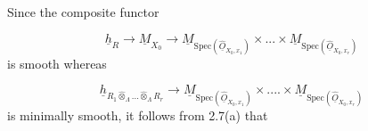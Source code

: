 \begin{center}
\end{center}
Since the composite functor

\begin{equation*}
\underline{h}_R \to \underline{M}_{X_0} \to \underline{M}_{\mathrm{Spec}(\widehat{\underline{O}}_{X_0,x_1})} \times ... \times \underline{M}_{\mathrm{Spec}(\widehat{\underline{O}}_{X_0,x_r})}
\end{equation*}
is smooth whereas

\begin{equation*}
\underline{h}_{R_1 \widehat{\otimes}_\Lambda ... \widehat{\otimes}_\Lambda R_r} \to \underline{M}_{\mathrm{Spec}(\widehat{\underline{O}}_{X_0,x_1})} \times .... \times \underline{M}_{\mathrm{Spec}(\widehat{\underline{O}}_{X_0,x_r})}
\end{equation*}
is minimally smooth, it follows from 2.7(a) that


